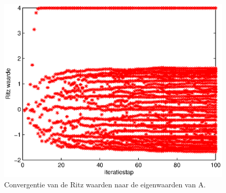 \documentclass[a4paper]{article}
\begin{document}
\begin{figure}
\centerline{\includegraphics{pictures/opgave7arnoldiBeter.eps}}
\caption{Convergentie van de Ritz waarden naar de eigenwaarden van A.}
\label{fig:opgave7}
\end{figure}
\end{document}
